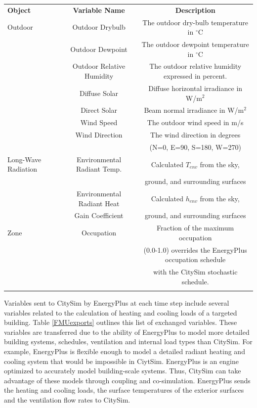 \documentclass{tBPS2e}
\theoremstyle{plain}
\theoremstyle{definition}
\theoremstyle{remark}
\begin{document}
\begin{table}[H]
{\begin{tabular}[l]{@{}lcc}\toprule
  \bf{Object} &  \bf{Variable Name} & \bf{Description} \\
\colrule
  Outdoor & Outdoor Drybulb & The outdoor dry-bulb temperature in $^{\circ}\mathrm{C}$ \\
 & Outdoor Dewpoint & The outdoor dewpoint temperature in $^{\circ}\mathrm{C}$ \\
 & Outdoor Relative Humidity & The outdoor relative humidity expressed in percent. \\
 & Diffuse Solar & Diffuse horizontal irradiance in W/m$^2$ \\
 & Direct Solar & Beam normal irradiance in W/m$^2$ \\
 & Wind Speed & The outdoor wind speed in m/s \\
 & Wind Direction & The wind direction in degrees\\&&  (N=0, E=90, S=180, W=270) \\
 \hline
 Long-Wave Radiation & Environmental Radiant Temp. & Calculated $T_{env}$ from the sky,\\&& ground, and surrounding surfaces \\
 & Environmental Radiant Heat  & Calculated $h_{env}$ from the sky,\\
 & Gain Coefficient & ground, and surrounding surfaces \\
 
 \hline
Zone & Occupation & Fraction of the maximum occupation\\&& (0.0-1.0) overrides the EnergyPlus occupation schedule\\&&  with the CitySim stochastic schedule. \\
\botrule
\end{tabular}}
\label{FMUimports}
\end{table}

Variables sent to CitySim by EnergyPlus at each time step include several
variables related to the calculation of heating and cooling loads of a
targeted building. Table \ref{FMUexports} outlines this list of exchanged variables.
These variables are transferred due to the ability of
EnergyPlus to model more detailed building systems, schedules, ventilation and
internal load types than CitySim. For example, EnergyPlus is flexible enough
to model a detailed radiant heating and cooling system that would be
impossible in CiytSim. EnergyPlus is an engine
optimized to accurately model building-scale systems. Thus, CitySim can take 
advantage of these models through coupling and co-simulation. EnergyPlus sends
the heating and cooling loads, the surface temperatures of the exterior
surfaces and the ventilation flow rates to CitySim.
\end{document}
